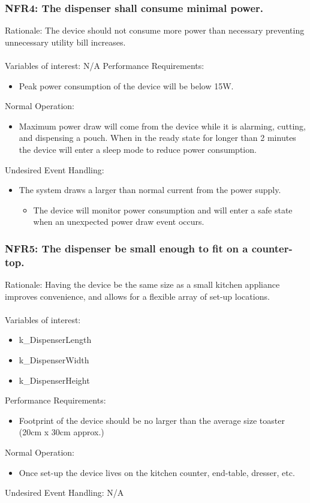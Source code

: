 \documentclass[12pt]{article}
\begin{document}
\subsubsection*{NFR4: The dispenser shall consume minimal power.}
Rationale: The device should not consume more power than necessary preventing unnecessary utility bill increases.
\\\\
Variables of interest: N/A
\bigskip
Performance Requirements:
\begin{itemize}[noitemsep,topsep=0pt]
    \item Peak power consumption of the device will be below 15W.
\end{itemize}
\bigskip
Normal Operation:
\begin{itemize}[noitemsep,topsep=0pt]
    \item Maximum power draw will come from the device while it is alarming, cutting, and dispensing a pouch. When in the ready state for longer than 2 minutes the device will enter a sleep mode to reduce power consumption.
\end{itemize}
\bigskip
Undesired Event Handling:
\begin{itemize}[noitemsep,topsep=0pt]
    \item The system draws a larger than normal current from the power supply.
    \begin{itemize}
    \item The device will monitor power consumption and will enter a safe state when an unexpected power draw event occurs.
    \end{itemize}
\end{itemize}
\bigskip
\subsubsection*{NFR5: The dispenser be small enough to fit on a counter-top.}
Rationale: Having the device be the same size as a small kitchen appliance improves convenience, and allows for a flexible array of set-up locations.
\\\\
Variables of interest:
\begin{itemize}[noitemsep,topsep=0pt]
    \item k\_DispenserLength
    \item k\_DispenserWidth
    \item k\_DispenserHeight
\end{itemize} 
\bigskip
Performance Requirements:
\begin{itemize}[noitemsep,topsep=0pt]
    \item Footprint of the device should be no larger than the average size toaster (20cm x 30cm approx.)
\end{itemize}
\bigskip
Normal Operation: 
\begin{itemize}[noitemsep,topsep=0pt]
    \item Once set-up the device lives on the kitchen counter, end-table, dresser, etc.
\end{itemize}
\bigskip
Undesired Event Handling: N/A
\\ \\
\end{document}
